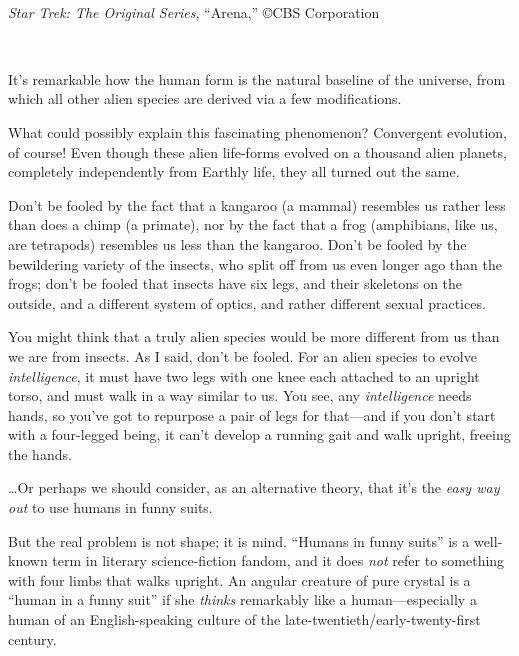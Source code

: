 {{
 ~}

{\centering
{}
 \newline
 \textit{Star Trek: The Original Series},
``Arena,'' \copyright  CBS Corporation
\par}


\bigskip

{
 ~}

{
 It's remarkable how the human form is the natural
baseline of the universe, from which all other alien species are
derived via a few modifications.}

{
 What could possibly explain this fascinating phenomenon?
Convergent evolution, of course! Even though these alien life-forms
evolved on a thousand alien planets, completely independently from
Earthly life, they all turned out the same.}

{
 Don't be fooled by the fact that a kangaroo (a
mammal) resembles us rather less than does a chimp (a primate), nor by
the fact that a frog (amphibians, like us, are tetrapods) resembles us
less than the kangaroo. Don't be fooled by the
bewildering variety of the insects, who split off from us even longer
ago than the frogs; don't be fooled that insects have
six legs, and their skeletons on the outside, and a different system of
optics, and rather different sexual practices.}

{
 You might think that a truly alien species would be more different
from us than we are from insects. As I said, don't be
fooled. For an alien species to evolve \textit{intelligence}, it must
have two legs with one knee each attached to an upright torso, and must
walk in a way similar to us. You see, any \textit{intelligence} needs
hands, so you've got to repurpose a pair of legs for
that---and if you don't start with a four-legged being,
it can't develop a running gait and walk upright,
freeing the hands.}

{
 \ldots Or perhaps we should consider, as an alternative theory,
that it's the \textit{easy way out} to use humans in
funny suits.}

{
 But the real problem is not shape; it is mind.
``Humans in funny suits'' is a
well-known term in literary science-fiction fandom, and it does
\textit{not} refer to something with four limbs that walks upright. An
angular creature of pure crystal is a ``human in a
funny suit'' if she \textit{thinks} remarkably like a
human---especially a human of an English-speaking culture of the
late-twentieth/early-twenty-first century.}

}
